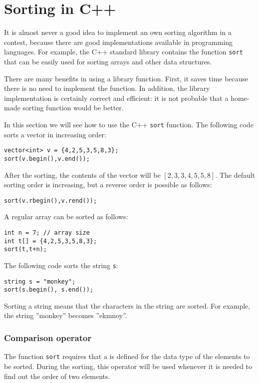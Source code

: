 \section{Sorting in C++}


It is almost never a good idea to implement
an own sorting algorithm
in a contest, because there are good
implementations available in programming languages.
For example, the C++ standard library contains
the function \texttt{sort} that can be easily used for
sorting arrays and other data structures.

There are many benefits in using a library function.
First, it saves time because there is no need to
implement the function.
In addition, the library implementation is
certainly correct and efficient: it is not probable
that a home-made sorting function would be better.

In this section we will see how to use the
C++ \texttt{sort} function.
The following code sorts
a vector in increasing order:
\begin{lstlisting}
vector<int> v = {4,2,5,3,5,8,3};
sort(v.begin(),v.end());
\end{lstlisting}
After the sorting, the contents of the
vector will be
$[2,3,3,4,5,5,8]$.
The default sorting order is increasing,
but a reverse order is possible as follows:
\begin{lstlisting}
sort(v.rbegin(),v.rend());
\end{lstlisting}
A regular array can be sorted as follows:
\begin{lstlisting}
int n = 7; // array size
int t[] = {4,2,5,3,5,8,3};
sort(t,t+n);
\end{lstlisting}
The following code sorts the string \texttt{s}:
\begin{lstlisting}
string s = "monkey";
sort(s.begin(), s.end());
\end{lstlisting}
Sorting a string means that the characters
in the string are sorted.
For example, the string ''monkey'' becomes ''ekmnoy''.

\subsubsection{Comparison operator}


The function \texttt{sort} requires that
a  is defined for the data type
of the elements to be sorted.
During the sorting, this operator will be used
whenever it is needed to find out the order of two elements.

